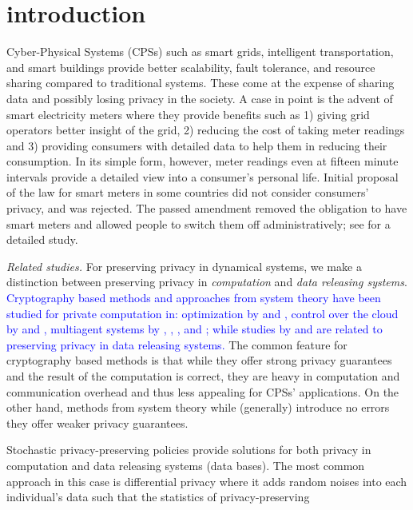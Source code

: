 \documentclass{ifacconf}
\newcommand{\+}{\mathsmaller{+}}
\newcommand{\blue}[1]{\textcolor{blue}{#1}}
\begin{document}
\section{introduction}\label{sec:introduction}
Cyber-Physical Systems (CPSs) such as smart grids, intelligent transportation, and smart buildings provide better scalability, fault tolerance, and resource sharing compared to traditional systems. These come at the expense of sharing data and possibly losing privacy in the society.  
   A case in point is the advent of smart electricity meters where they provide benefits such as
     1) giving grid operators better insight of the grid, 2) reducing the cost of taking meter readings and 3) providing consumers with detailed data to help them in reducing their consumption. In its simple form, however, meter readings even at fifteen minute intervals provide a detailed view into a consumer's
personal life. 
 Initial proposal of the law for smart meters in some countries did
not consider consumers' privacy, and was rejected.
 The passed amendment removed the obligation to have smart
meters and allowed people to switch them off administratively; see \cite{van2019smart} for a detailed study.
\par \textit{Related studies.}
For preserving privacy in dynamical 
systems, we make a distinction between preserving privacy in \textit{computation} and \textit{data releasing systems}. 
\blue{Cryptography based methods and approaches from system theory have been studied for private computation in: optimization by \cite{sultangazin2020symmetries} and \cite{Alexandru2020a}, control over the cloud by \cite{kim2022dynamic} and \cite{murguia2020secure}, multiagent systems by \cite{altafini2020system}, \cite{darup2018encrypted}, \cite{monshizadeh2019plausible}, and \cite{hosseinalizadeh2022private}; while studies by  \cite{lu2020privacy} and \cite{tsiamis2017state} are related to preserving privacy in data releasing systems.}
The common feature for cryptography based methods is that while
 they offer strong privacy guarantees and the result of the computation is correct, they are heavy in computation and communication overhead and thus less appealing for CPSs' applications.
On the other hand, methods from system theory while (generally) introduce no errors they offer weaker privacy guarantees.
 \par Stochastic privacy-preserving policies provide solutions for both privacy in computation and data releasing systems (data bases). The most common approach in this case is differential privacy where it adds random noises into each individual’s data such that the statistics of privacy-preserving
\end{document}
